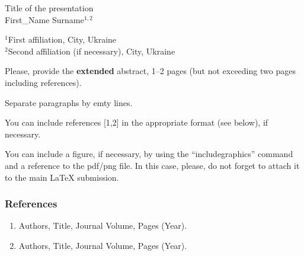 \documentclass[12pt]{article}
\begin{document}
\begin{center}
    {\Large Title of the presentation}\\
    \vspace{0.2in}
    First\_Name Surname$^{1,2}$ \vspace{0.2in}
    
    
    $^{1}$First affiliation, City, Ukraine\\
    $^{2}$Second affiliation (if necessary), City, Ukraine
\end{center}

Please, provide the {\bf extended} abstract, 1--2 pages (but not exceeding two pages including references).

Separate paragraphs by emty lines.

You can include references [1,2] in the appropriate format (see below), if necessary.

You can include a figure, if necessary, by using the
``includegraphics'' command and a reference to the pdf/png file.
In this case, please, do not forget to attach it to the main LaTeX submission.




{\scriptsize
\subsubsection*{\small References}
\begin{enumerate}
    \item Authors, Title, Journal Volume, Pages (Year).
    \item Authors, Title, Journal Volume, Pages (Year).
\end{enumerate}
}
\end{document}
